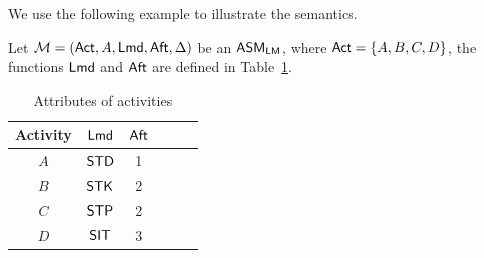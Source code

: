 	
	We use the following example to illustrate the semantics.
	\begin{example}
		Let ${\mathcal{M} } = ({\sf Act},A,{\sf Lmd},{\sf Aft},\Delta)$ be an $\textsf{ASM}_\textsf{LM}$, where ${\sf Act} = \{A,B,C,D\}$, the functions ${\sf Lmd}$ and ${\sf Aft}$ are defined in Table~\ref{tab-attribute}.
		\begin{table}[htbp]
			\begin{center}
				\begin{tabular}{|c|c|c|c|c|c|}
					\hline
					Activity & ${\sf Lmd}$ & ${\sf Aft}$\\
					\hline
					$A$ & $\mathsf{STD}$ & 1 \\
					\hline
					$B$ & $\mathsf{STK}$ & 2 \\
					\hline
					$C$ & $\mathsf{STP}$ & 2 \\
					\hline
					$D$ & $\mathsf{SIT}$ & 3 \\
					\hline
				\end{tabular}
				\caption{Attributes of activities}
				\label{tab-attribute}
			\end{center}
		\end{table}
		

\end{example}
